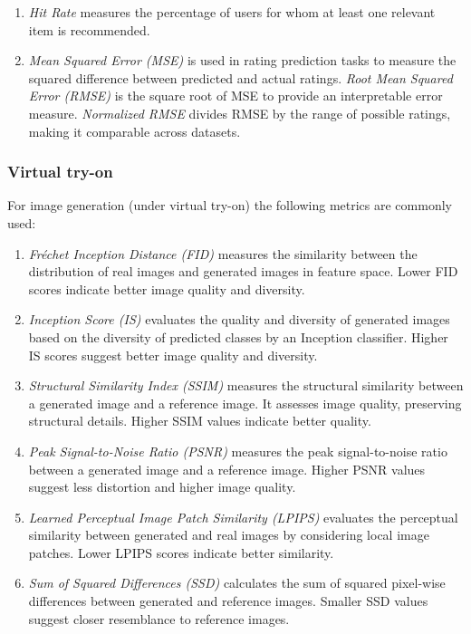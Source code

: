 \begin{enumerate}
				\item \textit{Hit Rate} measures the percentage of users for whom at least one relevant item is recommended.
				\item \textit{Mean Squared Error (MSE)} is used in rating prediction tasks to measure the squared difference between predicted and actual ratings. \textit{Root Mean Squared Error (RMSE)} is the square root of MSE to provide an interpretable error measure. \textit{Normalized RMSE} divides RMSE by the range of possible ratings, making it comparable across datasets.
			\end{enumerate}
		
		\subsubsection{Virtual try-on}
			For image generation (under virtual try-on) the following metrics are commonly used:

			\begin{enumerate}
				\item \textit{Fréchet Inception Distance (FID)} measures the similarity between the distribution of real images and generated images in feature space. Lower FID scores indicate better image quality and diversity.
				\item \textit{Inception Score (IS)} evaluates the quality and diversity of generated images based on the diversity of predicted classes by an Inception classifier. Higher IS scores suggest better image quality and diversity.
				\item \textit{Structural Similarity Index (SSIM)} measures the structural similarity between a generated image and a reference image. It assesses image quality, preserving structural details. Higher SSIM values indicate better quality.
				\item \textit{Peak Signal-to-Noise Ratio (PSNR)} measures the peak signal-to-noise ratio between a generated image and a reference image. Higher PSNR values suggest less distortion and higher image quality.
				\item \textit{Learned Perceptual Image Patch Similarity (LPIPS)} evaluates the perceptual similarity between generated and real images by considering local image patches. Lower LPIPS scores indicate better similarity.
				\item \textit{Sum of Squared Differences (SSD)} calculates the sum of squared pixel-wise differences between generated and reference images. Smaller SSD values suggest closer resemblance to reference images.
			\end{enumerate}

